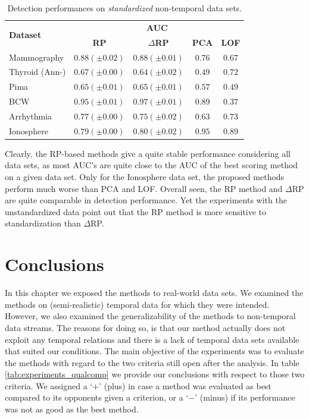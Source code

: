 \begin{table}[h]
	\centering
	\vspace{-0.05cm}
	\caption{Detection performances on \textit{standardized} non-temporal data sets.}
	\label{tab:experiments_beyond}
	\begin{tabular}{l c c c c}
		\toprule	
		\multirow{2}{*}{\textbf{Dataset}} & \multicolumn{4}{c}{\textbf{AUC}} \\
		\cmidrule{2-5}
					& \textbf{RP} 						& \textbf{$\Delta$RP} 			&  \textbf{PCA}		& \textbf{LOF}	\\
		\midrule
		Mammography & $\mathbf{0.88 (\pm 0.02)}$		& $\mathbf{0.88 (\pm 0.01)}$	& $0.76$			& $0.67$  	\\
		Thyroid (Ann-)  & $0.67 (\pm 0.00)$ 				& $0.64 (\pm 0.02)$ 			& $0.49$			& $\mathbf{0.72}$	\\
		Pima 		& $\mathbf{0.65 (\pm 0.01)}$ 		& $\mathbf{0.65 (\pm 0.01)}$ 	& $0.57$			& $0.49$	\\	
		BCW  	& $0.95 (\pm 0.01)$					& $\mathbf{0.97 (\pm 0.01)}$ 	& $0.89$			& $0.37$	\\
		Arrhythmia	& $\mathbf{0.77 (\pm 0.00)}$ 		& $0.75 (\pm 0.02)$  			& $0.63$			& $0.73$	\\
		Ionosphere	& $0.79 (\pm 0.00)$ 				& $0.80 (\pm 0.02)$  			& $\mathbf{0.95}$	& $0.89$	\\
		\bottomrule
	\end{tabular}
	\vspace{-0.05cm}
\end{table}

Clearly, the RP-based methods give a quite stable performance considering all data sets, as most AUC's are quite close to the AUC of the best scoring method on a given data set. Only for the Ionosphere data set, the proposed methods perform much worse than PCA and LOF. Overall seen, the RP method and $\Delta$RP are quite comparable in detection performance. Yet the experiments with the unstandardized data point out that the RP method is more sensitive to standardization than $\Delta$RP. 

\section{Conclusions}
In this chapter we exposed the methods to real-world data sets. We examined the methods on (semi-realistic) temporal data for which they were intended. However, we also examined the generalizability of the methods to non-temporal data streams. The reasons for doing so, is that our method actually does not exploit any temporal relations and there is a lack of temporal data sets available that suited our conditions. The main objective of the experiments was to evaluate the methods with regard to the two criteria still open after the analysis. In table \ref{tab:experiments_qualcomp} we provide our conclusions with respect to those two criteria. 
We assigned a `$+$' (plus) in case a method was evaluated as best compared to its opponents given a criterion, or a `$-$' (minus) if its performance was not as good as the best method.

